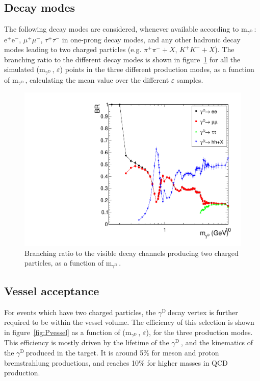 \documentclass[12pt,a4paper,]{article}
\newcommand{\mathDP}{\gamma^{\mathrm{D}}\ }
\newcommand{\DP}{$\mathDP$}
\newcommand{\mDP}{m$_{\mathDP}$}
\begin{document}
\subsection{Decay modes}

The following decay modes are considered, whenever available according
to \mDP: e$^{+}$e$^{-}$, $\mu^{+}\mu^{-}$, $\tau^{+}\tau^{-}$ in
one-prong decay modes, and any other hadronic decay modes leading to
two charged particles (e.g. $\pi^{+}\pi^{-}+X$, $K^{+}K^{-}+X$).
The branching ratio to the different decay modes is shown in
figure~\ref{fig:brdecay} for all the simulated (\mDP, $\varepsilon$)
points in the three different production modes, as a function of \mDP,
calculating the mean value over the different $\varepsilon$
samples.

\begin{figure}[h!]
  \centering
\includegraphics[width=1.\textwidth]{figures/DecayBRvsMass_final_logX.pdf}
\caption{Branching ratio to the visible decay channels producing two charged particles, as a function of \mDP.}
\label{fig:brdecay}
\end{figure}


\subsection{Vessel acceptance}

For events which have two charged particles, the \DP decay vertex is
further required to be within the vessel volume. The efficiency of
this selection is shown in figure~\ref{fig:Pvessel} as a function of
(\mDP, $\varepsilon$), for the three production modes. This efficiency
is mostly driven by the lifetime of the \DP, and the kinematics of the
\DP produced in the target. It is around 5\% for meson and proton
bremstrahlung productions, and reaches 10\% for higher masses in QCD
production.
\end{document}
